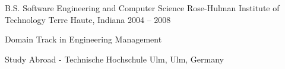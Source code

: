 
\begin{cventries}
  \cveducationentry
  {B.S. Software Engineering and Computer Science}
  {Rose-Hulman Institute of Technology}
  {}
  {Terre Haute, Indiana}
  {2004 -- 2008}
  {
    \begin{cvitems}
      \item Domain Track in Engineering Management
      \item Study Abroad - Technische Hochschule Ulm, Ulm, Germany
    \end{cvitems}
  }
\end{cventries}
